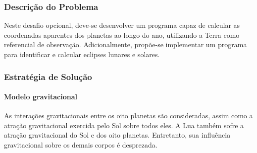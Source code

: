 \documentclass[12pt,a4paper]{article}
\begin{document}
\subsubsection{Descrição do Problema}

Neste desafio opcional, deve-se desenvolver um programa capaz de calcular as coordenadas aparentes dos planetas ao longo do ano, utilizando a Terra como referencial de observação. Adicionalmente, propõe-se implementar um programa para identificar e calcular eclipses lunares e solares.

\subsubsection{Estratégia de Solução}

\paragraph{Modelo gravitacional}

As interações gravitacionais entre os oito planetas são consideradas, assim como a atração gravitacional exercida pelo Sol sobre todos eles. A Lua também sofre a atração gravitacional do Sol e dos oito planetas. Entretanto, sua influência gravitacional sobre os demais corpos é desprezada.
\end{document}
